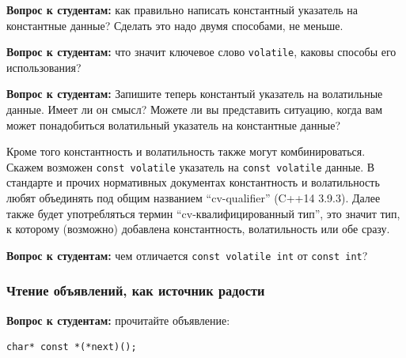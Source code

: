 \documentclass[a4paper,12pt,oneside]{article}
\newif\ifanswers
\begin{document}
\textbf{Вопрос к студентам:} как правильно написать константный указатель на константные данные? Сделать это надо двумя способами, не меньше.

\textbf{Вопрос к студентам:} что значит ключевое слово \lstinline!volatile!, каковы способы его использования?

\textbf{Вопрос к студентам:} Запишите теперь константый указатель на волатильные данные. Имеет ли он смысл? Можете ли вы представить ситуацию, когда вам может понадобиться волатильный указатель на константные данные?

\ifanswers
Ответы на первые два вопроса очевидны, но ответ на третий может быть несколько экзотичен: если этот указатель \lstinline!register! переменная, которая определяет область памяти откуда идёт чтение и которая при этом соответсвует не настоящему регистру а некоему устройству, притворяющемуся регистром, но допускающему смену состояний, то конструкция обретает смысл.
\fi

Кроме того константность и волатильность также могут комбинироваться. Скажем возможен \lstinline!const volatile! указатель на \lstinline!const volatile! данные. В стандарте и прочих нормативных документах константность и волатильность любят объединять под общим названием ``cv-qualifier'' (C++14 3.9.3). Далее также будет употребляться термин ``cv-квалифи\-цированный тип'', это значит тип, к которому (возможно) добавлена константность, волатильность или обе сразу.

\textbf{Вопрос к студентам:} чем отличается \lstinline!const volatile int! от \lstinline!const int!?

\ifanswers
Правильный ответ: константность означает, что оттуда можно только читать. При этом волатильность означает, что чтения оттуда нельзя переупорядочивать. Интересно, что здесь \lstinline!const! это по сути способ сказать \lstinline!readonly!, чем семантически выразить неизменность данных.
\fi

\subsubsection{Чтение объявлений, как источник радости}\label{AlgDecl}

\textbf{Вопрос к студентам:} прочитайте объявление:

\begin{lstlisting}
char* const *(*next)();
\end{lstlisting}
\end{document}
